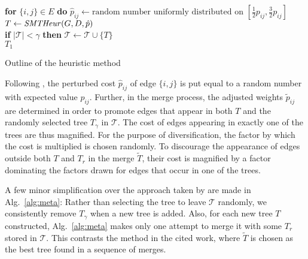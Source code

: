 \begin{algorithm}
 {
  \textbf{for} $\{i,j\}\in E$ \textbf{do} $\hat{p}_{ij}\leftarrow\text{random number uniformly distributed on
  $\left[\frac{1}{2}p_{ij},\frac{3}{2}p_{ij}\right]$}$\\
  $T\leftarrow\text{\textit{SMTHeur}$(G,D,\hat{p})$}$\\
  \textbf{if} $|\mathcal{T}|<\gamma$ \textbf{then} $\mathcal{T}\leftarrow \mathcal{T}\cup \{T\}$\\
}
\Return $T_1$

\caption{Outline of the heuristic method}
\label{alg:meta}
\end{algorithm}

Following \citet{pajor18}, the perturbed cost $\hat{p}_{ij}$ of edge $\{i,j\}$ is put equal to a random number with expected value $p_{ij}$.
Further, in the merge process, the adjusted weights $\tilde{p}_{ij}$ are determined in order to 
promote edges that appear in both $T$ and the randomly selected tree $T_{\gamma}$ in $\mathcal{T}$. 
The cost of edges appearing in exactly one of the trees are thus magnified.
For the purpose of diversification, the factor by which the cost is multiplied is chosen randomly.
To discourage the appearance of edges outside both $T$ and $T_r$ in the merge $\tilde{T}$,
their cost is magnified by a factor dominating the factors drawn for edges that occur in one of the trees.

A few minor simplification over the approach taken by \citet{pajor18} are made in Alg.\ \ref{alg:meta}:
Rather than selecting the tree to leave $\mathcal{T}$ randomly, we consistently remove $T_{\gamma}$ when a new tree is added.
Also, for each new tree $T$ constructed, Alg.\ \ref{alg:meta} makes only one attempt to merge it with some $T_r$ stored in $\mathcal{T}$.
This contrasts the method in the cited work, where $\tilde{T}$ is chosen as the best tree found in a sequence of merges.

